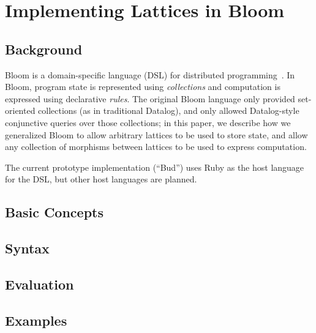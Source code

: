 \section{Implementing Lattices in Bloom}

\subsection{Background}
Bloom is a domain-specific language (DSL) for distributed
programming~\cite{Alvaro2011,bloom}. In Bloom, program state is represented
using \emph{collections} and computation is expressed using declarative
\emph{rules}. The original Bloom language only provided set-oriented collections
(as in traditional Datalog), and only allowed Datalog-style conjunctive queries
over those collections; in this paper, we describe how we generalized Bloom to
allow arbitrary lattices to be used to store state, and allow any collection of
morphisms between lattices to be used to express computation.

The current prototype implementation (``Bud'') uses Ruby as the host language
for the DSL, but other host languages are planned.

\subsection{Basic Concepts}

\subsection{Syntax}

\subsection{Evaluation}

\subsection{Examples}
